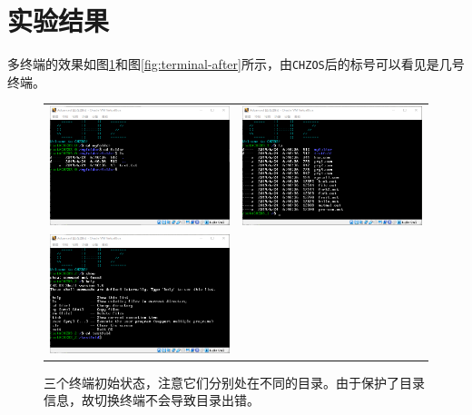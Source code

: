 \documentclass[logo,reportComp]{thesis}
\begin{document}
\section{实验结果}
多终端的效果如图\ref{fig:terminal}和图\ref{fig:terminal-after}所示，由\verb'CHZOS'后的标号可以看见是几号终端。
\begin{figure}[H]
\centering
\begin{tabular}{cc}
\includegraphics[width=0.5\linewidth]{fig/term_1.png}&
\includegraphics[width=0.5\linewidth]{fig/term_2.png}\\
\includegraphics[width=0.5\linewidth]{fig/term_3.png}
\end{tabular}
\caption{三个终端初始状态，注意它们分别处在不同的目录。由于保护了目录信息，故切换终端不会导致目录出错。}
\label{fig:terminal}
\end{figure}
\end{document}
